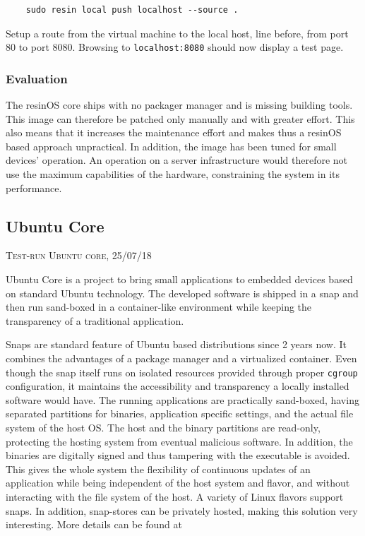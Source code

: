 \documentclass[]{scrartcl}
\begin{document}
\begin{verbatim}
	sudo resin local push localhost --source .
\end{verbatim}

Setup a route from the virtual machine to the local host, line before, from port 80 to port 8080. Browsing to \texttt{localhost:8080} should now display a test page.

\subsubsection{Evaluation}

The resinOS core ships with no packager manager and is missing building tools. This image can therefore be patched only manually and with greater effort. This also means that it increases the maintenance effort and makes thus a resinOS based approach unpractical. In addition, the image has been tuned for small devices' operation. An operation on a server infrastructure would therefore not use the maximum capabilities of the hardware, constraining the system in its performance.

\subsection{Ubuntu Core}
{\small\textsc{Test-run Ubuntu core, 25/07/18} \bigskip}

Ubuntu Core is a project to bring small applications to embedded devices based on standard Ubuntu technology. The developed software is shipped in a snap and then run sand-boxed in a container-like environment while keeping the transparency of a traditional application. 

Snaps are standard feature of Ubuntu based distributions since 2 years now. It combines the advantages of a package manager and a virtualized container. Even though the snap itself runs on isolated resources provided through proper \texttt{cgroup} configuration, it maintains the accessibility and transparency a locally installed software would have. 
The running applications are practically sand-boxed, having separated partitions for binaries, application specific settings, and the actual file system of the host OS. The host and the binary partitions are read-only, protecting the hosting system from eventual malicious software. 
In addition, the binaries are digitally signed and thus tampering with the executable is avoided. This gives the whole system the flexibility of continuous updates of an application while being independent of the host system and flavor, and without interacting with the file system of the host.
A variety of Linux flavors support snaps. In addition, snap-stores can be privately hosted, making this solution very interesting. More details can be found at \cite{snap01}
\end{document}
